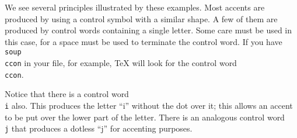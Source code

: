  
We see several principles illustrated by these examples. Most 
accents are produced by using a control symbol with a similar 
shape. A few of them are produced by control words containing a 
single letter. Some care must be used in this case, for a space 
must be used to terminate the control word. If you have {\tt 
soup\\ccon} in your file, for example, \TeX{} will look for the 
control word {\tt\\ccon}. 
 
Notice that there is a control word {\tt\\i} also. This produces 
the letter ``i'' without the dot over it; this allows an accent 
to be put over the lower part of the letter. There is an 
analogous control word {\tt\\j} that produces a dotless ``j'' 
for accenting purposes. 
 
 
\toindex{\^{}} 
\toindex{=} 
 
 

